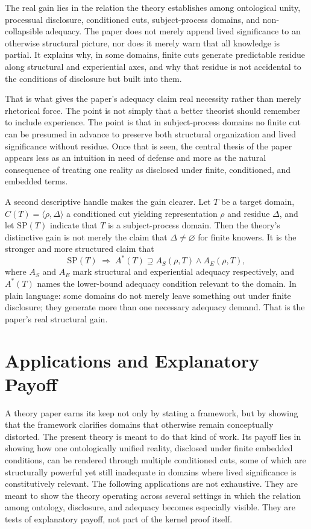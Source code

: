 \documentclass[11pt]{article}
\begin{document}
The real gain lies in the relation the theory establishes among ontological unity, processual disclosure, conditioned cuts, subject-process domains, and non-collapsible adequacy. The paper does not merely append lived significance to an otherwise structural picture, nor does it merely warn that all knowledge is partial. It explains why, in some domains, finite cuts generate predictable residue along structural and experiential axes, and why that residue is not accidental to the conditions of disclosure but built into them.

That is what gives the paper's adequacy claim real necessity rather than merely rhetorical force. The point is not simply that a better theorist should remember to include experience. The point is that in subject-process domains no finite cut can be presumed in advance to preserve both structural organization and lived significance without residue. Once that is seen, the central thesis of the paper appears less as an intuition in need of defense and more as the natural consequence of treating one reality as disclosed under finite, conditioned, and embedded terms.

A second descriptive handle makes the gain clearer. Let \(T\) be a target domain, \(C(T)=\langle \rho,\Delta\rangle\) a conditioned cut yielding representation \(\rho\) and residue \(\Delta\), and let \(\mathrm{SP}(T)\) indicate that \(T\) is a subject-process domain. Then the theory's distinctive gain is not merely the claim that \(\Delta \neq \varnothing\) for finite knowers. It is the stronger and more structured claim that
\[
\mathrm{SP}(T) \;\Rightarrow\; A^{*}(T) \supseteq A_S(\rho,T)\wedge A_E(\rho,T),
\]
where \(A_S\) and \(A_E\) mark structural and experiential adequacy respectively, and \(A^{*}(T)\) names the lower-bound adequacy condition relevant to the domain. In plain language: some domains do not merely leave something out under finite disclosure; they generate more than one necessary adequacy demand. That is the paper's real structural gain.
\section{Applications and Explanatory Payoff}

A theory paper earns its keep not only by stating a framework, but by showing that the framework clarifies domains that otherwise remain conceptually distorted. The present theory is meant to do that kind of work. Its payoff lies in showing how one ontologically unified reality, disclosed under finite embedded conditions, can be rendered through multiple conditioned cuts, some of which are structurally powerful yet still inadequate in domains where lived significance is constitutively relevant. The following applications are not exhaustive. They are meant to show the theory operating across several settings in which the relation among ontology, disclosure, and adequacy becomes especially visible. They are tests of explanatory payoff, not part of the kernel proof itself.
\end{document}

